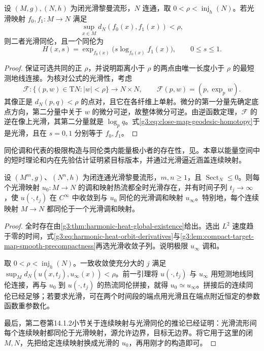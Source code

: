 \begin{lemma}\label{g3:lem:close-maps-geodesic-homotopy}
	设 \((M,g),(N,h)\) 为闭光滑黎曼流形，\(N\) 连通，取 \(0<\rho<\operatorname{inj}_h(N)\)。若光滑映射 \(f_0,f_1:M\to N\) 满足
	\[
		\sup_{x\in M}d_N(f_0(x),f_1(x))<\rho,
	\]
	则二者光滑同伦，且一个同伦为
	\begin{equation}\label{g3:eq:close-map-geodesic-homotopy}
		H(x,s)=\exp_{f_0(x)}\bigl(s\log_{f_0(x)}f_1(x)\bigr),
		\qquad0\le s\le1.
	\end{equation}
\end{lemma}
\begin{proof}
	保证可选共同的正 \(\rho\)，并说明距离小于 \(\rho\) 的两点由唯一长度小于 \(\rho\) 的最短测地线连接。为核对公式的光滑性，考虑
	\[
		\mathcal F:\{(p,w)\in\mathrm TN:|w|<\rho\}\longrightarrow N\times N,
		\qquad\mathcal F(p,w)=(p,\exp_pw).
	\]
	其像正是 \(d_N(p,q)<\rho\) 的点对，且它在各纤维上单射。微分的第一分量先确定底点方向，第二分量中关于 \(w\) 的微分可逆，故整体微分可逆。由逆函数定理，\(\mathcal F\) 的逆在像上光滑，其第二分量就是 \(\log_pq\)。式\eqref{g3:eq:close-map-geodesic-homotopy}于是光滑，且在 \(s=0,1\) 分别等于 \(f_0,f_1\)。
\end{proof}

同伦调和代表的极限构造与同伦类内能量极小者的存在性，见\cite[第11.A节定理及推论，第156--158页]{EellsSampson1964HarmonicMaps}。本章以能量空间中的短时理论和内在先验估计证明紧目标版本，并通过光滑逼近涵盖连续映射。

\begin{theorem}\label{g3:thm:harmonic-heat-homotopy-representative}
	设 \((M^m,g)\)、\((N^n,h)\) 为闭连通光滑黎曼流形，\(m,n\ge1\)，且 \(\operatorname{Sect}_N\le0\)。则每个光滑映射 \(u_0:M\to N\) 的调和映射热流都全时光滑存在，并有时间子列 \(t_j\to\infty\)，使 \(u(\cdot,t_j)\) 在 \(C^\infty\) 中收敛到与 \(u_0\) 同伦的光滑调和映射 \(u_\infty\)。特别地，每个连续映射 \(M\to N\) 都同伦于一个光滑调和映射。
\end{theorem}
\begin{proof}
	全时存在由\cref{g3:thm:harmonic-heat-global-existence}给出。选出 \(L^2\) 速度趋于零的时间，式\eqref{g3:eq:harmonic-heat-orbit-derivatives}与\cref{g3:lem:compact-target-map-smooth-precompactness}再选光滑收敛子列。说明极限 \(u_\infty\) 调和。

	取 \(0<\rho<\operatorname{inj}_h(N)\)。一致收敛使充分大的 \(j\) 满足
	\(\sup_Md_N(u(x,t_j),u_\infty(x))<\rho\)。前一引理将 \(u(\cdot,t_j)\) 与 \(u_\infty\) 用短测地线同伦连接，再与 \(u_0\) 到 \(u(\cdot,t_j)\) 的热流同伦拼接，就得 \(u_0\simeq u_\infty\)。拼接后的连续同伦已经足够；若要求光滑，可在两个时间段的端点用光滑且在端点附近恒定的参数函数重参数化。

	最后，第二卷第14.1.2小节关于连续映射与光滑同伦的推论已经证明：光滑流形间每个连续映射都同伦于光滑映射，源允许边界，目标无边界。将它用于这里的闭 \(M,N\)，先把给定连续映射换成光滑的 \(u_0\)，再用刚才的构造即可。
\end{proof}

